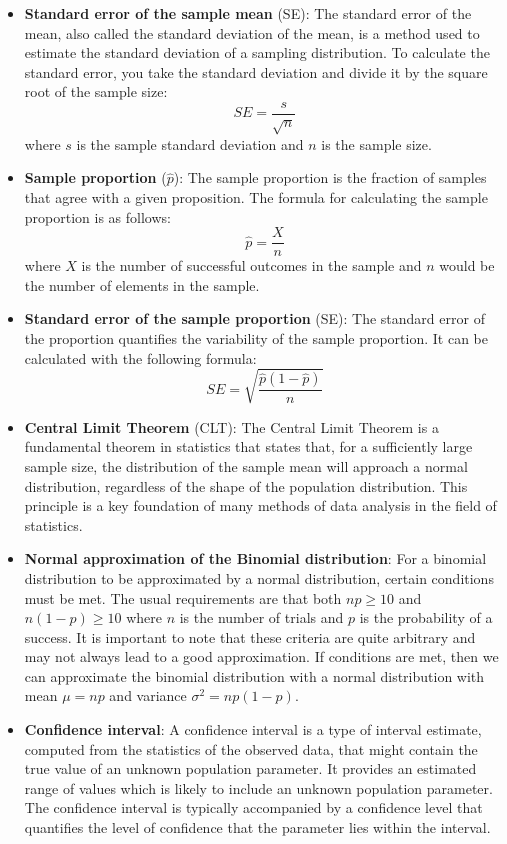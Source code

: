 \documentclass{article}
\begin{document}
\begin{itemize}
\item \textbf{Standard error of the sample mean} (SE): The standard error of the mean, also called the standard deviation of the mean, is a method used to estimate the standard deviation of a sampling distribution. To calculate the standard error, you take the standard deviation and divide it by the square root of the sample size:
\[ SE = \frac{s}{\sqrt{n}} \]
where $s$ is the sample standard deviation and $n$ is the sample size.

\item \textbf{Sample proportion} ($\hat{p}$): The sample proportion is the fraction of samples that agree with a given proposition. The formula for calculating the sample proportion is as follows:
\[ \hat{p} = \frac{X}{n} \]
where $X$ is the number of successful outcomes in the sample and $n$ would be the number of elements in the sample.

\item \textbf{Standard error of the sample proportion} (SE): The standard error of the proportion quantifies the variability of the sample proportion. It can be calculated with the following formula:
\[ SE = \sqrt{\frac{\hat{p}(1-\hat{p})}{n}} \]

\item \textbf{Central Limit Theorem} (CLT): The Central Limit Theorem is a fundamental theorem in statistics that states that, for a sufficiently large sample size, the distribution of the sample mean will approach a normal distribution, regardless of the shape of the population distribution. This principle is a key foundation of many methods of data analysis in the field of statistics.

\item \textbf{Normal approximation of the Binomial distribution}: For a binomial distribution to be approximated by a normal distribution, certain conditions must be met. The usual requirements are that both $np \geq 10$ and $n(1 - p) \geq 10$ where $n$ is the number of trials and $p$ is the probability of a success. It is important to note that these criteria are quite arbitrary and may not always lead to a good approximation. If conditions are met, then we can approximate the binomial distribution with a normal distribution with mean $\mu = np$ and variance $\sigma^2 = np(1-p)$.

\item \textbf{Confidence interval}: A confidence interval is a type of interval estimate, computed from the statistics of the observed data, that might contain the true value of an unknown population parameter. It provides an estimated range of values which is likely to include an unknown population parameter. The confidence interval is typically accompanied by a confidence level that quantifies the level of confidence that the parameter lies within the interval.


\end{itemize}
\end{document}
